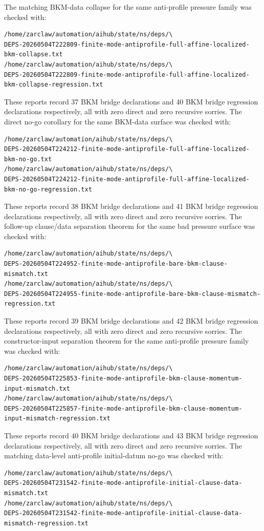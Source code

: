 \documentclass[11pt]{article}
\begin{document}
The matching BKM-data collapse for the same anti-profile pressure family was
checked with:
\begin{verbatim}
/home/zarclaw/automation/aihub/state/ns/deps/\
DEPS-20260504T222809-finite-mode-antiprofile-full-affine-localized-bkm-collapse.txt
/home/zarclaw/automation/aihub/state/ns/deps/\
DEPS-20260504T222809-finite-mode-antiprofile-full-affine-localized-bkm-collapse-regression.txt
\end{verbatim}
These reports record 37 BKM bridge declarations and 40 BKM bridge regression
declarations respectively, all with zero direct and zero recursive sorries.
The direct no-go corollary for the same BKM-data surface was checked with:
\begin{verbatim}
/home/zarclaw/automation/aihub/state/ns/deps/\
DEPS-20260504T224212-finite-mode-antiprofile-full-affine-localized-bkm-no-go.txt
/home/zarclaw/automation/aihub/state/ns/deps/\
DEPS-20260504T224212-finite-mode-antiprofile-full-affine-localized-bkm-no-go-regression.txt
\end{verbatim}
These reports record 38 BKM bridge declarations and 41 BKM bridge regression
declarations respectively, all with zero direct and zero recursive sorries.
The follow-up clause/data separation theorem for the same bad pressure surface
was checked with:
\begin{verbatim}
/home/zarclaw/automation/aihub/state/ns/deps/\
DEPS-20260504T224952-finite-mode-antiprofile-bare-bkm-clause-mismatch.txt
/home/zarclaw/automation/aihub/state/ns/deps/\
DEPS-20260504T224955-finite-mode-antiprofile-bare-bkm-clause-mismatch-regression.txt
\end{verbatim}
These reports record 39 BKM bridge declarations and 42 BKM bridge regression
declarations respectively, all with zero direct and zero recursive sorries.
The constructor-input separation theorem for the same anti-profile pressure
family was checked with:
\begin{verbatim}
/home/zarclaw/automation/aihub/state/ns/deps/\
DEPS-20260504T225853-finite-mode-antiprofile-bkm-clause-momentum-input-mismatch.txt
/home/zarclaw/automation/aihub/state/ns/deps/\
DEPS-20260504T225857-finite-mode-antiprofile-bkm-clause-momentum-input-mismatch-regression.txt
\end{verbatim}
These reports record 40 BKM bridge declarations and 43 BKM bridge regression
declarations respectively, all with zero direct and zero recursive sorries.
The matching data-level anti-profile initial-datum no-go was checked with:
\begin{verbatim}
/home/zarclaw/automation/aihub/state/ns/deps/\
DEPS-20260504T231542-finite-mode-antiprofile-initial-clause-data-mismatch.txt
/home/zarclaw/automation/aihub/state/ns/deps/\
DEPS-20260504T231542-finite-mode-antiprofile-initial-clause-data-mismatch-regression.txt
\end{verbatim}
\end{document}
